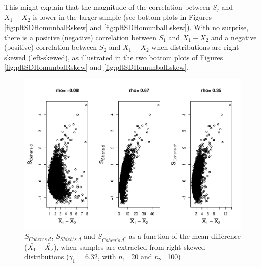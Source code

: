 \documentclass[
  english,
  man,mask,floatsintext]{apa6}
\begin{document}
This might explain that the magnitude of the correlation between \(S_j\) and \(\bar{X_1}-\bar{X_2}\) is lower in the larger sample (see bottom plots in Figures \ref{fig:pltSDHomunbalRskew} and \ref{fig:pltSDHomunbalLskew}). With no surprise, there is a positive (negative) correlation between \(S_1\) and \(\bar{X_1}-\bar{X_2}\) and a negative (positive) correlation between \(S_2\) and \(\bar{X_1}-\bar{X_2}\) when distributions are right-skewed (left-skewed), as illustrated in the two bottom plots of Figures \ref{fig:pltSDHomunbalRskew} and \ref{fig:pltSDHomunbalLskew}.

\begin{figure}
\centering
\includegraphics{Correlation_files/figure-latex/pltStdzrHomunbalRskew-1.pdf}
\caption{\label{fig:pltStdzrHomunbalRskew}\(S_{Cohen's \; d}\), \(S_{Shieh's \; d}\) and \(S_{Cohen's \; d^*}\) as a function of the mean difference (\(\bar{X_1}-\bar{X_2}\)), when samples are extracted from right skewed distributions (\(\gamma_1 = 6.32\), with \(n_1\)=20 and \(n_2\)=100)}
\end{figure}
\end{document}

